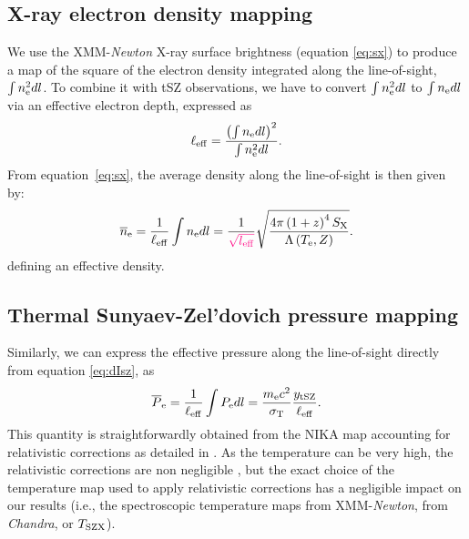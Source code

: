 \documentclass[twocolumn,traditabstract]{aa}
\newcommand{\ccor}[1]{\textcolor{Mypink}{#1}}
\def\TSZ {T_{\rm SZX}}
\begin{document}
\subsection{X-ray electron density mapping}
We use the XMM-\textit{Newton} X-ray surface brightness (equation \ref{eq:sx}) to produce a map of the square of the electron density integrated along the line-of-sight, $\int n_{\rm e}^2 dl$. To combine it with tSZ observations, we have to convert $\int n_{\rm e}^2 dl$ to $\int n_{\rm e} dl$ via an effective electron depth, expressed as
\begin{equation}
	\ell_{\rm eff} = \frac{\left(\int n_{\rm e} dl\right)^2}{\int n_{\rm e}^2 dl}.
\label{eq:l_eff}
\end{equation}
From equation~\ref{eq:sx}, the \ccor{average} density along the line-of-sight is then given by:
\begin{equation}
	\overline{n}_{\rm e} = \frac{1}{\ell_{\rm eff}} \int n_{\rm e} dl = \frac{1}{\ccor{\sqrt{l_{\rm eff}}}}\sqrt{\frac{4 \pi \left(1+z\right)^4 S_{\rm X}}{\Lambda\left(T_{\rm e}, Z\right)}}.
\label{eq:pseudo_ne}
\end{equation}
\ccor{defining an effective density.}

\subsection{Thermal Sunyaev-Zel'dovich pressure mapping}
\ccor{Similarly,} we can express the effective pressure along the line-of-sight directly from equation \ref{eq:dIsz}, as
\begin{equation}
	\overline{P}_{\rm e} = \frac{1}{\ell_{\rm eff}} \int P_{\rm e} dl = \frac{m_{\rm e} c^2}{\sigma_{\rm T}} \frac{y_{\rm tSZ}}{\ell_{\rm eff}}.
\label{eq:pseudo_p}
\end{equation}
This quantity is straightforwardly obtained from the NIKA map accounting for relativistic corrections as detailed in \cite{Adam2016b}. As the temperature can be very high, the relativistic corrections are non negligible \citep{Pointecouteau1998,Itoh2003}, but the exact choice of the temperature map used to apply relativistic corrections has a negligible impact on our results \ccor{(i.e., the spectroscopic temperature maps from XMM-\textit{Newton}, from \textit{Chandra}, or $\TSZ$)}. 

\end{document}
